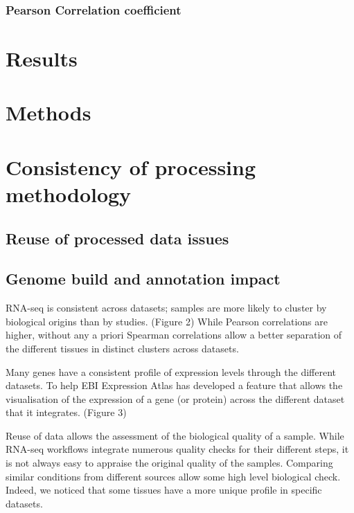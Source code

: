 \subsubsection{Pearson Correlation coefficient}

\section{Results}\label{sec:Trans_Results}
\section{Methods}


%



\section{Consistency of processing methodology}\label{sec:Trans_consistentMethodo}

    \subsection{Reuse of processed data issues}\label{subsec:Trans_reuseOfData}

    \subsection{Genome build and annotation impact}\label{subsec:Trans_AnnotImpact}

RNA-seq is consistent across datasets; samples are more likely to cluster by
biological origins than by studies. (Figure 2)
While Pearson correlations are higher, without any a priori Spearman correlations
allow a better separation of the different tissues in distinct clusters across
datasets.

Many genes have a consistent profile of expression levels through the different
datasets.
To help EBI Expression Atlas has developed a feature that allows the visualisation
of the expression of a gene (or protein) across the different dataset that it
integrates. (Figure 3)

Reuse of data allows the assessment of the biological quality of a sample.
While RNA-seq workflows integrate numerous quality checks for their different steps,
it is not always easy to appraise the original quality of the samples. Comparing
similar conditions from different sources allow some high level biological check.
Indeed, we noticed that some tissues have a more unique profile in specific
datasets.

